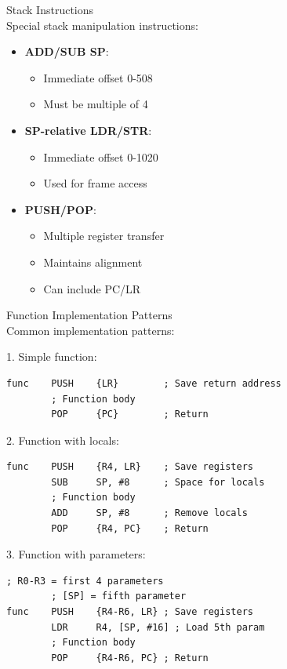 \begin{concept}{Stack Instructions}\\
Special stack manipulation instructions:
\begin{itemize}
  \item \textbf{ADD/SUB SP}:
    \begin{itemize}
      \item Immediate offset 0-508
      \item Must be multiple of 4
    \end{itemize}
  \item \textbf{SP-relative LDR/STR}:
    \begin{itemize}
      \item Immediate offset 0-1020
      \item Used for frame access
    \end{itemize}
  \item \textbf{PUSH/POP}:
    \begin{itemize}
      \item Multiple register transfer
      \item Maintains alignment
      \item Can include PC/LR
    \end{itemize}
\end{itemize}
\end{concept}

\begin{KR}{Function Implementation Patterns}\\
Common implementation patterns:

1. Simple function:
\begin{lstlisting}[language=armasm, style=basesmol]
func    PUSH    {LR}        ; Save return address
        ; Function body
        POP     {PC}        ; Return
\end{lstlisting}

2. Function with locals:
\begin{lstlisting}[language=armasm, style=basesmol]
func    PUSH    {R4, LR}    ; Save registers
        SUB     SP, #8      ; Space for locals
        ; Function body
        ADD     SP, #8      ; Remove locals
        POP     {R4, PC}    ; Return
\end{lstlisting}

3. Function with parameters:
\begin{lstlisting}[language=armasm, style=basesmol]
        ; R0-R3 = first 4 parameters
        ; [SP] = fifth parameter
func    PUSH    {R4-R6, LR} ; Save registers
        LDR     R4, [SP, #16] ; Load 5th param
        ; Function body
        POP     {R4-R6, PC} ; Return
\end{lstlisting}
\end{KR}

